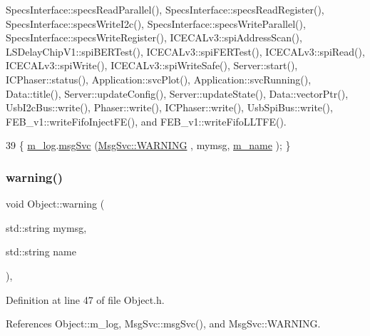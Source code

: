Specs\+Interface\+::specs\+Read\+Parallel(), Specs\+Interface\+::specs\+Read\+Register(), Specs\+Interface\+::specs\+Write\+I2c(), Specs\+Interface\+::specs\+Write\+Parallel(), Specs\+Interface\+::specs\+Write\+Register(), I\+C\+E\+C\+A\+Lv3\+::spi\+Address\+Scan(), L\+S\+Delay\+Chip\+V1\+::spi\+B\+E\+R\+Test(), I\+C\+E\+C\+A\+Lv3\+::spi\+F\+E\+R\+Test(), I\+C\+E\+C\+A\+Lv3\+::spi\+Read(), I\+C\+E\+C\+A\+Lv3\+::spi\+Write(), I\+C\+E\+C\+A\+Lv3\+::spi\+Write\+Safe(), Server\+::start(), I\+C\+Phaser\+::status(), Application\+::svc\+Plot(), Application\+::svc\+Running(), Data\+::title(), Server\+::update\+Config(), Server\+::update\+State(), Data\+::vector\+Ptr(), Usb\+I2c\+Bus\+::write(), Phaser\+::write(), I\+C\+Phaser\+::write(), Usb\+Spi\+Bus\+::write(), F\+E\+B\+\_\+v1\+::write\+Fifo\+Inject\+F\+E(), and F\+E\+B\+\_\+v1\+::write\+Fifo\+L\+L\+T\+F\+E().


\begin{DoxyCode}
39 \{ \hyperlink{classObject_a0d269813dd7ac1f24bc143031e2963f2}{m\_log}.\hyperlink{classMsgSvc_ad25f18047920cc59a314e5098259711c}{msgSvc} (\hyperlink{classMsgSvc_ae671eb7301996cd049d2da8a65925926a7cefae88f2ba26b2b05b676a383c834b}{MsgSvc::WARNING} , mymsg, \hyperlink{classObject_a8b83c95c705d2c3ba0d081fe1710f48d}{m\_name} ); \}
\end{DoxyCode}
\mbox{\label{classObject_a11f101db4dd73d9391b0231818881d86}} 
\subsubsection{\texorpdfstring{warning()}{warning()}\hspace{0.1cm}{\footnotesize\ttfamily [2/2]}}
{\footnotesize\ttfamily void Object\+::warning (\begin{DoxyParamCaption}\item[{std\+::string}]{mymsg,  }\item[{std\+::string}]{name }\end{DoxyParamCaption})\hspace{0.3cm}{\ttfamily [inline]}, {\ttfamily [inherited]}}



Definition at line 47 of file Object.\+h.



References Object\+::m\+\_\+log, Msg\+Svc\+::msg\+Svc(), and Msg\+Svc\+::\+W\+A\+R\+N\+I\+NG.


